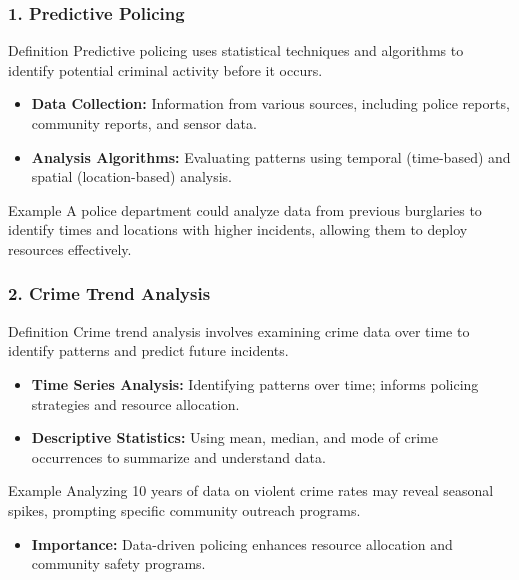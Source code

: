 \documentclass[aspectratio=169]{beamer}
\begin{document}
\begin{frame}[fragile]
    \frametitle{1. Predictive Policing}
    \begin{block}{Definition}
        Predictive policing uses statistical techniques and algorithms to identify potential criminal activity before it occurs.
    \end{block}
    
    \begin{itemize}
        \item \textbf{Data Collection:} Information from various sources, including police reports, community reports, and sensor data.
        \item \textbf{Analysis Algorithms:} Evaluating patterns using temporal (time-based) and spatial (location-based) analysis.
    \end{itemize}
    
    \begin{block}{Example}
        A police department could analyze data from previous burglaries to identify times and locations with higher incidents, allowing them to deploy resources effectively.
    \end{block}
\end{frame}

\begin{frame}[fragile]
    \frametitle{2. Crime Trend Analysis}
    \begin{block}{Definition}
        Crime trend analysis involves examining crime data over time to identify patterns and predict future incidents.
    \end{block}
    
    \begin{itemize}
        \item \textbf{Time Series Analysis:} Identifying patterns over time; informs policing strategies and resource allocation.
        \item \textbf{Descriptive Statistics:} Using mean, median, and mode of crime occurrences to summarize and understand data.
    \end{itemize}
    
    \begin{block}{Example}
        Analyzing 10 years of data on violent crime rates may reveal seasonal spikes, prompting specific community outreach programs.
    \end{block}
    
    \begin{itemize}
        \item \textbf{Importance:} Data-driven policing enhances resource allocation and community safety programs.
    \end{itemize}
\end{frame}
\end{document}
